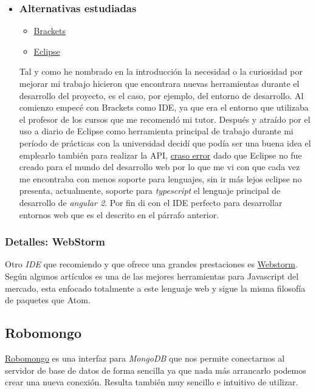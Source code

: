 \begin{itemize}
	\item \subsubsection{Alternativas estudiadas}
	\begin{itemize}
		\item \href{http://brackets.io/}{Brackets}
		\item \href{http://eclipse.org}{Eclipse}
	\end{itemize}
	Tal y como he nombrado en la introducción la necesidad o la curiosidad por mejorar mi trabajo hicieron que encontrara nuevas herramientas durante el desarrollo del proyecto, es el caso, por ejemplo, del entorno de desarrollo. Al comienzo empecé con Brackets como IDE, ya que era el entorno que utilizaba el profesor de los cursos que me recomendó  mi tutor. Después y atraído por el uso a diario de Eclipse como herramienta principal de trabajo durante mi período de prácticas con la universidad decidí que podía ser una buena idea el emplearlo también para realizar la API, \underline{craso error} dado que Eclipse no fue creado para el mundo del desarrollo web por lo que me vi con que cada vez me encontraba con menos soporte para lenguajes, sin ir más lejos eclipse no presenta, actualmente, soporte para  \emph{typescript} el lenguaje principal de desarrollo de  \emph{angular 2}. Por fin di con el IDE perfecto para desarrollar entornos web que es el descrito en el párrafo anterior.
\end{itemize}

\subsubsection{Detalles: WebStorm}\label{detalle_webstorm}
Otro \emph{IDE} que recomiendo y que ofrece una grandes prestaciones es \href{https://www.jetbrains.com/webstorm/}{Webstorm}. Según algunos artículos \cite{articulo1} es una de las mejores herramientas para Javascript del mercado, esta enfocado totalmente a este lenguaje web y sigue la misma filosofía de paquetes que Atom. 


\subsection{Robomongo}\label{herramientas_robomongo}
\href{http://http//robomongo.org/}{Robomongo} es una interfaz para \emph{MongoDB} que nos permite conectarnos al servidor de base de datos de forma sencilla ya que nada más arrancarlo podemos crear una nueva conexión. Resulta también muy sencillo e intuitivo de utilizar.

